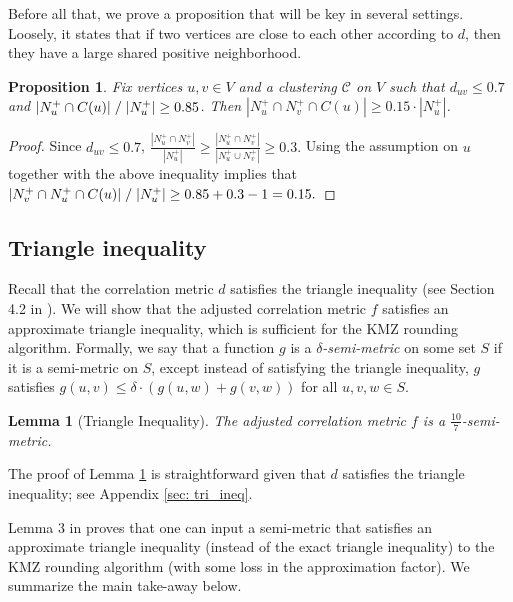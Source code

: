 \documentclass[11pt]{article}
\newtheorem{lemma}{Lemma}
\newtheorem{proposition}{Proposition}
\begin{document}
Before all that, we prove a proposition that will be key in several settings. Loosely, it states that if two vertices are close to each other according to $d$, then they have a large shared positive neighborhood. 
 \begin{proposition} \label{prop: pos_overlap}
     Fix vertices $u,v \in V$ and a clustering $\mathcal{C}$ on $V$ such that $d_{uv} \leq 0.7$ and $|N_u^+ \cap C(u)|\hspace{1mm}/ \hspace{1mm} |N_u^+|\geq 0.85$.
     Then $|N_u^+ \cap N_v^+ \cap C(u)| \geq 0.15 \cdot |N_u^+|$.
 \end{proposition}
\begin{proof}
    Since $d_{uv} \leq 0.7$, 
    $\frac{|N_u^+ \cap N_v^+|}{|N_u^+|} \geq \frac{|N_u^+ \cap N_v^+|}{|N_u^+ \cup N_v^+|} \geq 0.3.$
    Using the assumption on $u$ together with the above inequality implies that $|N_v^+ \cap N_u^+ \cap C(u)|\hspace{1mm}/ \hspace{1mm}|N_u^+| \geq 0.85 + 0.3 - 1 = 0.15.$
\end{proof}


\subsection{Triangle inequality}\label{sec: tri-ineq}
Recall that the correlation metric $d$ satisfies the triangle inequality (see Section 4.2 in \cite{DMN23}). We will show that the adjusted correlation metric $f$ satisfies an approximate triangle inequality, which is sufficient for the KMZ rounding algorithm. 
Formally, we say that a function $g$ is a \emph{$\delta$-semi-metric} on some set $S$ if it is a semi-metric on $S$, except instead of satisfying the triangle inequality, $g$ satisfies 
$g(u,v) \leq \delta \cdot( g(u,w) + g(v,w))$ for all $u,v,w \in S$. 


\begin{lemma}[Triangle Inequality] \label{lem: adjusted_tri_ineq}
    The adjusted correlation metric $f$ is a $\frac{10}{7}$-semi-metric. 
\end{lemma}

The proof of Lemma \ref{lem: adjusted_tri_ineq} is straightforward given that $d$ satisfies the triangle inequality; see Appendix \ref{sec: tri_ineq}. 


Lemma 3 in \cite{DMN23} proves that one can input a semi-metric that satisfies an approximate triangle inequality (instead of the exact triangle inequality) to the KMZ rounding algorithm (with some loss in the approximation factor). We summarize the main take-away below.
\end{document}
